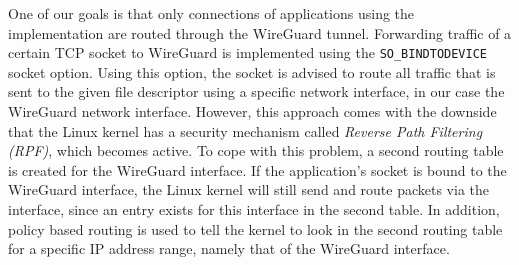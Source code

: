 One of our goals is that only connections of applications using the \ld implementation are routed through the WireGuard tunnel.
Forwarding traffic of a certain TCP socket to WireGuard is implemented using the \texttt{SO\_BINDTODEVICE} socket option.
Using this option, the socket is advised to route all traffic that is sent to the given file descriptor using a specific network interface, in our case the WireGuard network interface.
However, this approach comes with the downside that the Linux kernel has a security mechanism called \textit{Reverse Path Filtering (RPF)}, which becomes active.
To cope with this problem, a second routing table is created for the WireGuard interface.
If the application's socket is bound to the WireGuard interface, the Linux kernel will still send and route packets via the interface, since an entry exists for this interface in the second table.
In addition, policy based routing is used to tell the kernel to look in the second routing table for a specific IP address range, namely that of the WireGuard interface.
 
